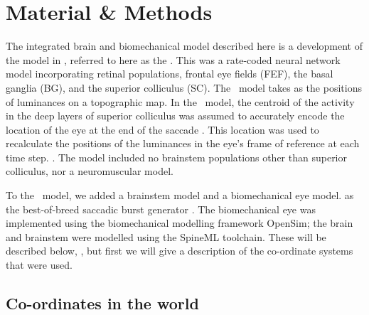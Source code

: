\documentclass{frontiersSCNS}
\begin{document}
\section{Material \& Methods} \label{sec:methods}

The integrated brain and biomechanical model described here is a
development of the model in \cite{cope_basal_2017}, referred to here
as the . This was a rate-coded neural network model
incorporating retinal populations, frontal eye fields (FEF), the basal
ganglia (BG), and the superior colliculus (SC).  The \ccg~model takes
as  the positions of luminances  on a topographic map.   In the \ccg~model, the
centroid of the activity in the deep layers of superior colliculus was
assumed to accurately encode the location of the eye at the end of the
saccade
\citep{wurtz_activity_1972,robinson_eye_1972,van_gisbergen_collicular_1987,mcilwain_lateral_1982}.  This location was used to
recalculate the positions of the luminances in the eye's frame of
reference at each time step. .  The model
included no brainstem populations other than superior colliculus, nor
a neuromuscular model.

To the \ccg~model, we added a brainstem model and a biomechanical eye
model.  \citep{gancarz_neural_1998} as the best-of-breed saccadic
burst generator \citep{girard_brainstem_2005}.  The biomechanical eye
was implemented using the biomechanical modelling framework OpenSim;
the brain and brainstem were modelled using the SpineML toolchain.
These will be described below, , but first we will give a description of the
co-ordinate systems that were used.

\subsection{Co-ordinates in the world} \label{sec:methods:coords}
\end{document}

